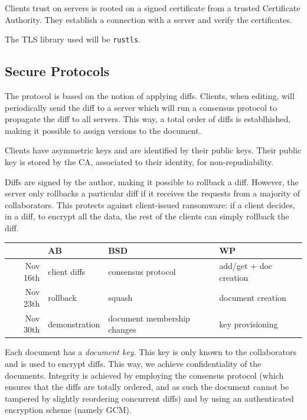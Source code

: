Clients trust on servers is rooted on a signed certificate from a
trusted Certificate Authority. They establish a connection with a
server and verify the certificates.

The TLS library used will be \texttt{rustls}\cite{rustls}.

\subsection{Secure Protocols}

The protocol is based on the notion of applying diffs.
Clients, when editing, will periodically send the diff to a
server which will run a consensus protocol to propagate the diff
to all servers. This way, a total order of diffs is establhished,
making it possible to assign versions to the document.

Clients have asymmetric keys and are identified by their public
keys.
Their public key is stored by the CA, associated to their identity,
for non-repudiability.

Diffs are signed by the author, making it possible to rollback a
diff. However, the server only rollbacks a particular diff if it
receives the requests from a majority of collaborators. This
protects against client-issued ransomware: if a client decides,
in a diff, to encrypt all the data, the rest of the clients can
simply rollback the diff.

\begin{table}[ht]
    \centering
    \label{Effort Commitment}
    \begin{tabular}{r|l|l|l}
        & AB & BSD & WP \\
        \hline
        Nov 16th & client diffs & consensus protocol & add/get + doc creation \\
        Nov 23th & rollback & squash & document creation \\
        Nov 30th & demonstration & document membership changes & key provisioning\\
    \end{tabular}
\end{table}

Each document has a \emph{document key}. This key is only known
to the collaborators and is used to encrypt diffs. This way, we
achieve confidentiality of the documents. Integrity is achieved
by employing the consensus protocol (which ensures that the diffs
are totally ordered, and as such the document cannot be tampered
by slightly reordering concurrent diffs) and by using an
authenticated encryption scheme (namely GCM).

